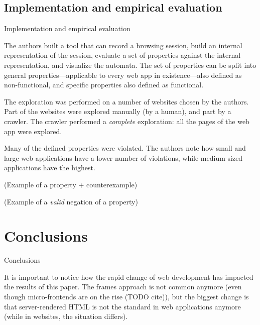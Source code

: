 \documentclass[usenames,dvipsnames]{beamer}
\begin{document}
\subsection{Implementation and empirical evaluation}
\begin{frame}{Implementation and empirical evaluation}

The authors built a tool that can record a browsing session, build an internal representation of the session, evaluate a set of properties against the internal representation, and visualize the automata. The set of properties can be split into general properties---applicable to every web app in existence---also defined as non-functional, and specific properties also defined as functional.

The exploration was performed on a number of websites chosen by the authors. Part of the websites were explored manually (by a human), and part by a crawler. The crawler performed a \emph{complete} exploration: all the pages of the web app were explored.

Many of the defined properties were violated. The authors note how small and large web applications have a lower number of violations, while medium-sized applications have the highest.

(Example of a property + counterexample)

(Example of a \textit{valid} negation of a property)

\end{frame}

\section{Conclusions}

\begin{frame}{Conclusions}

It is important to notice how the rapid change of web development has impacted the results of this paper. The frames approach is not common anymore (even though micro-frontends are on the rise (TODO cite)), but the biggest change is that server-rendered HTML is not the standard in web applications anymore (while in websites, the situation differs).

\end{frame}
\end{document}
